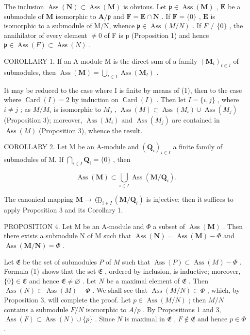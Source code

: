 The inclusion \(\operatorname{Ass}(\mathbf{N}) \subset \operatorname{Ass}(\mathbf{M})\) is obvious. Let \(\mathfrak{p} \in \operatorname{Ass}(\mathbf{M})\) , \(\mathbf{E}\) be a submodule of \(\mathbf{M}\) isomorphic to \(\mathbf{A} / \mathfrak{p}\) and \(\mathbf{F} = \mathbf{E} \cap \mathbf{N}\) . If \(\mathbf{F} = \{0\}\) , \(\mathbf{E}\) is isomorphic to a submodule of M/N, whence \(\mathfrak{p} \in \operatorname{Ass}(M/N)\) . If \(F \neq \{0\}\) , the annihilator of every element \(\neq 0\) of F is p (Proposition 1) and hence \(\mathfrak{p} \in \operatorname{Ass}(F) \subset \operatorname{Ass}(N)\) .

COROLLARY 1. If an A-module M is the direct sum of a family \((\mathbf{M}_t)_{t \in I}\) of submodules, then \(\operatorname{Ass}(\mathbf{M}) = \bigcup_{t \in I} \operatorname{Ass}(\mathbf{M}_t)\) .

It may be reduced to the case where I is finite by means of (1), then to the case where \(\operatorname{Card}(I) = 2\) by induction on \(\operatorname{Card}(I)\) . Then let \(I = \{i, j\}\) , where \(i \neq j\) ; as \(M/M_{i}\) is isomorphic to \(M_{j}\) , \(\operatorname{Ass}(M) \subset \operatorname{Ass}(M_{i}) \cup \operatorname{Ass}(M_{j})\) (Proposition 3); moreover, \(\operatorname{Ass}(M_{i})\) and \(\operatorname{Ass}(M_{j})\) are contained in \(\operatorname{Ass}(M)\) (Proposition 3), whence the result.

COROLLARY 2. Let M be an A-module and \((\mathbf{Q}_i)_{i\in I}\) a finite family of submodules of M. If \(\bigcap_{i\in I} \mathbf{Q}_i = \{0\}\) , then

\[
\operatorname{Ass} (\mathbf {M}) \subset \bigcup_ {i \in I} \operatorname{Ass} (\mathbf {M} / \mathbf {Q} _ {i}).
\]

The canonical mapping \(\mathbf{M} \to \bigoplus_{i \in I} (\mathbf{M} / \mathbf{Q}_i)\) is injective; then it suffices to apply Proposition 3 and its Corollary 1.

PROPOSITION 4. Let M be an A-module and \(\Phi\) a subset of \(\operatorname{Ass}(\mathbf{M})\) . Then there exists a submodule N of M such that \(\operatorname{Ass}(\mathbf{N}) = \operatorname{Ass}(\mathbf{M}) - \Phi\) and \(\operatorname{Ass}(\mathbf{M}/\mathbf{N}) = \Phi\) .

Let \(\mathfrak{E}\) be the set of submodules \(P\) of \(M\) such that \(\operatorname{Ass}(P) \subset \operatorname{Ass}(M) - \Phi\) . Formula (1) shows that the set \(\mathfrak{E}\) , ordered by inclusion, is inductive; moreover, \(\{0\} \in \mathfrak{E}\) and hence \(\mathfrak{E} \neq \varnothing\) . Let \(N\) be a maximal element of \(\mathfrak{E}\) . Then \(\operatorname{Ass}(N) \subset \operatorname{Ass}(M) - \Phi\) . We shall see that \(\operatorname{Ass}(M/N) \subset \Phi\) , which, by Proposition 3, will complete the proof. Let \(p \in \operatorname{Ass}(M/N)\) ; then \(M/N\) contains a submodule \(F/N\) isomorphic to \(A/p\) . By Propositions 1 and 3, \(\operatorname{Ass}(F) \subset \operatorname{Ass}(N) \cup \{p\}\) . Since \(N\) is maximal in \(\mathfrak{E}\) , \(F \notin \mathfrak{E}\) and hence \(p \in \Phi\) .

